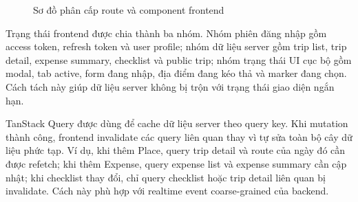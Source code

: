 \documentclass[a4paper]{report}
\begin{document}
\begin{figure}[H]
\centering
{}
\caption{Sơ đồ phân cấp route và component frontend}
\label{fig:frontend-components}
\end{figure}

Trạng thái frontend được chia thành ba nhóm. Nhóm phiên đăng nhập gồm access token, refresh token và user profile; nhóm dữ liệu server gồm trip list, trip detail, expense summary, checklist và public trip; nhóm trạng thái UI cục bộ gồm modal, tab active, form đang nhập, địa điểm đang kéo thả và marker đang chọn. Cách tách này giúp dữ liệu server không bị trộn với trạng thái giao diện ngắn hạn.

TanStack Query được dùng để cache dữ liệu server theo query key. Khi mutation thành công, frontend invalidate các query liên quan thay vì tự sửa toàn bộ cây dữ liệu phức tạp. Ví dụ, khi thêm Place, query trip detail và route của ngày đó cần được refetch; khi thêm Expense, query expense list và expense summary cần cập nhật; khi checklist thay đổi, chỉ query checklist hoặc trip detail liên quan bị invalidate. Cách này phù hợp với realtime event coarse-grained của backend.
\end{document}
